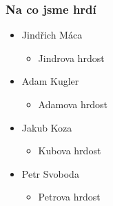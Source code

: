 \documentclass{beamer}
\begin{document}
\begin{frame}[allowframebreaks]\frametitle{Na co jsme hrdí} 
  \begin{itemize}
    \item Jindřich Máca
      \begin{itemize}
       \item Jindrova hrdost
      \end{itemize}
   
    \item Adam Kugler
      \begin{itemize}
       \item Adamova hrdost
     \end{itemize}
  
    \item Jakub Koza
      \begin{itemize}
       \item Kubova hrdost
     \end{itemize}
   
    \item Petr Svoboda
      \begin{itemize}
       \item Petrova hrdost
     \end{itemize}
   \end{itemize}  
\end{frame}
\end{document}
